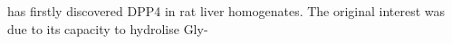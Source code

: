 \citet{Hopsu-Havu1966} has firstly discovered DPP4 in rat liver homogenates. The original interest was due to its capacity to hydrolise Gly-